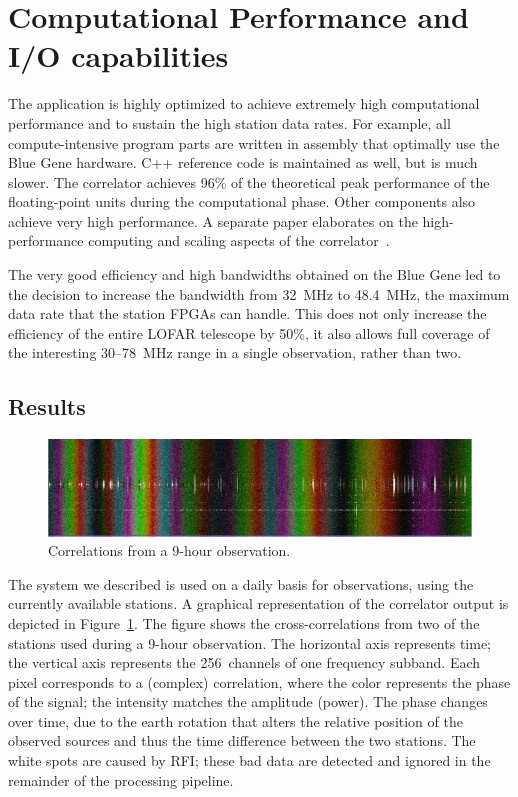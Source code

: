 \section{Computational Performance and I/O capabilities}

The application is highly optimized to achieve extremely high computational
performance and to sustain the high station data rates.
For example, all compute-intensive program parts are written in assembly
that optimally use the Blue Gene hardware.
C++ reference code is maintained as well, but is much slower.
The correlator achieves 96\% of the theoretical peak performance
of the floating-point units during the computational phase.
Other components also achieve very high performance.
A separate paper elaborates on the high-performance computing and scaling
aspects of the correlator~\cite{Romein:10a}.

The very good efficiency and high bandwidths obtained on the Blue Gene led
to the decision to increase the bandwidth from 32~MHz to 48.4~MHz, the
maximum data rate that the station FPGAs can handle.
This does not only increase the efficiency of the entire LOFAR telescope
by 50\%, it also allows full coverage of the interesting 30--78~MHz range
in a single observation, rather than two.


\subsection{Results}

\begin{figure}[ht]
\includegraphics[width=\columnwidth]{fringe.jpg}
\caption{Correlations from a 9-hour observation.}
\label{fig:fringe}
\end{figure}

The system we described is used on a daily basis for observations, using the
currently available stations.
A graphical representation of the correlator output is depicted in
Figure~\ref{fig:fringe}.
The figure shows the cross-correlations from two of the stations used during a
9-hour observation.
The horizontal axis represents time;
the vertical axis represents the 256~channels of one frequency subband.
Each pixel corresponds to a (complex) correlation, where the color represents
the phase of the signal; the intensity matches the amplitude (power).
The phase changes over time, due to the earth rotation that alters the
relative position of the observed sources and thus the time difference
between the two stations.
The white spots are caused by RFI; these bad data are detected and
ignored in the remainder of the processing pipeline.



